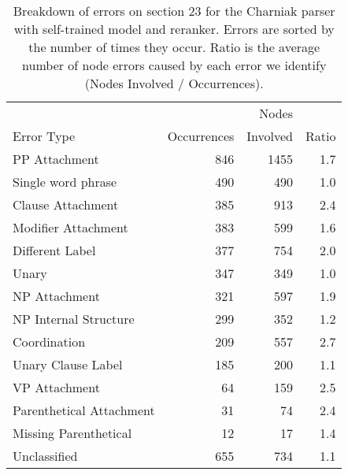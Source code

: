 \begin{table}
\small
\renewcommand{\tabcolsep}{1.7mm}
\begin{tabular}{|lrrr|}
	\hline
		                        &             & Nodes    &       \\
		Error Type\hspace{-8mm} & Occurrences & Involved & Ratio \\
	\hline
	\hline
		PP Attachment\hspace{-8mm} & 846 & 1455 & 1.7 \\
		Single word phrase\hspace{-8mm} & 490 & 490 & 1.0 \\
		Clause Attachment\hspace{-8mm} & 385 & 913 & 2.4 \\
		Modifier Attachment\hspace{-8mm} & 383 & 599 & 1.6 \\
		Different Label\hspace{-8mm} & 377 & 754 & 2.0 \\
		Unary & 347 & 349 & 1.0 \\
		NP Attachment\hspace{-8mm} & 321 & 597 & 1.9 \\
		NP Internal Structure\hspace{-8mm} & 299 & 352 & 1.2 \\
		Coordination & 209 & 557 & 2.7 \\
		Unary Clause Label\hspace{-8mm} & 185 & 200 & 1.1 \\
		VP Attachment & 64 & 159 & 2.5 \\
		Parenthetical Attachment\hspace{-8mm} & 31 & 74 & 2.4 \\
		Missing Parenthetical\hspace{-8mm} & 12 & 17 & 1.4 \\
		Unclassified & 655 & 734 & 1.1 \\
	\hline
\end{tabular}
\vspace{-2mm}
\caption{\label{tab:charniak-breakdown}
	Breakdown of errors on section 23 for the Charniak parser with self-trained
	model and reranker.  Errors are sorted by the number of times they occur.
	Ratio is the average number of node errors caused by each error we identify
	(\ie Nodes Involved / Occurrences).
}
\vspace{-6mm}
\end{table}

